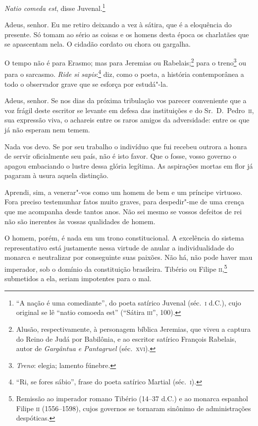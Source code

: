  \textit{Natio comeda est}, disse
Juvenal.\footnote{ ``A nação é uma comediante'', do poeta satírico Juvenal 
(séc.~\textsc{i} d.C.), cujo original se lê ``natio comoeda est'' 
(``Sátira \textsc{iii}'', 100).}


 Adeus, senhor. Eu me retiro deixando a vez à sátira, que é a eloquência
do presente. Só tomam ao sério as coisas e os homens desta época os
charlatães que se apascentam nela. O cidadão cordato ou chora ou gargalha.

 O tempo não é para Erasmo; mas para Jeremias ou
Rabelais;\footnote{ Alusão, respectivamente, à personagem bíblica Jeremias, que viveu a
captura do Reino de Judá por Babilônia, e ao escritor satírico François
Rabelais, autor de \textit{Gargântua e Pantagruel} (séc.~\textsc{xvi}).}
 para o treno\footnote{ \textit{Treno}: elegia; lamento fúnebre.}
 ou para o sarcasmo. \textit{Ride si sapis}:\footnote{ ``Ri, se
fores sábio'', frase do poeta satírico Martial (séc.~\textsc{i}).}
 diz, como o poeta, a história contemporânea a todo o observador grave
que se esforça por estudá"-la. 

 Adeus, senhor. Se nos dias da próxima tribulação vos parecer
conveniente que a voz frágil deste escritor se levante em defesa das
instituições e do Sr.~D.~Pedro~\textsc{ii}, sua expressão viva, o achareis entre
os raros amigos da adversidade: entre os que já não esperam nem temem. 

 Nada vos devo. Se por seu trabalho o indivíduo que fui recebeu
outrora a honra de servir oficialmente seu país, não é isto favor. Que
o fosse, vosso governo o apagou embaciando o lustre dessa glória
legítima. As aspirações mortas em flor já pagaram à usura aquela distinção. 

 Aprendi, sim, a venerar"-vos como um homem de bem e um príncipe
virtuoso. Fora preciso testemunhar fatos muito graves, para
despedir"-me de uma crença que me acompanha desde tantos anos. Não sei
mesmo se vossos defeitos de rei não são inerentes às vossas qualidades	\EP[1.2]
de homem. 

 O homem, porém, é nada em um trono constitucional. A excelência do
sistema representativo está justamente nessa virtude de anular a
individualidade do monarca e neutralizar por conseguinte suas paixões.
Não há, não pode haver mau imperador, sob o domínio da constituição
brasileira. Tibério ou Filipe
\textsc{ii},\footnote{ Remissão ao
imperador romano Tibério (14--37 d.C.) e ao monarca espanhol Filipe \textsc{ii}
(1556--1598), cujos governos se tornaram sinônimo de administrações
despóticas.} submetidos a ela, seriam impotentes para o mal. 

